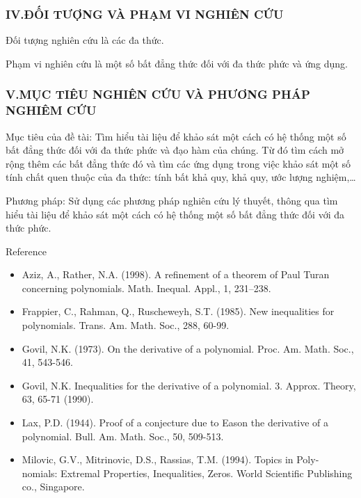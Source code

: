 \documentclass{beamer}
\begin{document}
\begin{frame}
\frametitle{IV.ĐỐI TƯỢNG VÀ PHẠM VI NGHIÊN CỨU}
\begin{block}{}
    Đối tượng nghiên cứu là các đa thức.\par Phạm vi nghiên cứu là một số bất đẳng thức đối với đa thức phức và ứng dụng.
\end{block}
\end{frame}
\begin{frame}
\frametitle{V.MỤC TIÊU NGHIÊN CỨU VÀ PHƯƠNG PHÁP NGHIÊM CỨU}
\begin{block}{Mục tiêu của đề tài:}
Tìm hiểu tài liệu để khảo sát một cách có hệ thống một số bất đẳng thức đối với đa thức phức và đạo hàm của chúng. Từ đó tìm cách mở rộng thêm các bất đẳng thức đó và tìm các ứng dụng trong việc khảo sát một số tính chất quen thuộc của đa thức: tính bất khả quy, khả quy, ước lượng nghiệm,…
\end{block}
\begin{block}{Phương pháp:}
    Sử dụng các phương pháp nghiên cứu lý thuyết, thông qua tìm hiểu tài liệu để khảo sát một cách có hệ thống một số bất đẳng thức đối với đa thức phức.
\end{block}
\end{frame}
\begin{frame}{Reference}
\begin{itemize}
    \item {Aziz, A., Rather, N.A. (1998). A refinement of a theorem of Paul Turan concerning polynomials. Math. Inequal. Appl., 1, 231–238.}
    \item{Frappier, C., Rahman, Q., Ruscheweyh, S.T. (1985). New inequalities for polynomials. Trans. Am. Math. Soc., 288, 60-99.}
    \item{Govil, N.K. (1973). On the derivative of a polynomial. Proc. Am. Math. Soc., 41, 543-546.}
    \item{Govil, N.K. Inequalities for the derivative of a polynomial. 3. Approx. Theory, 63, 65-71 (1990).}
    \item{ Lax, P.D. (1944). Proof of a conjecture due to Eason the derivative of a polynomial. Bull. Am. Math. Soc., 50, 509-513.}
    \item{Milovic, G.V., Mitrinovic, D.S., Rassias, T.M. (1994). Topics in Poly- nomials: Extremal Properties, Inequalities, Zeros. World Scientific Publishing co., Singapore.}
\end{itemize}
    
\end{frame}
\end{document}
